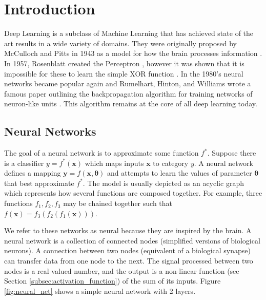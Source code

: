 
\chapter{Introduction}\label{cha:introduction}

Deep Learning is a subclass of Machine Learning that has achieved state of the art results in a wide variety of domains.
They were originally proposed by McCulloch and Pitts in 1943 as a model for how the brain processes information \cite{McCulloch_Pitts_1943}.
In 1957, Rosenblatt created the Perceptron \cite{Rosenblatt_1957, Rosenblatt_1958}, however it was shown that it is impossible for these to learn the simple XOR function \cite{Minsky_Papert_1988}.
In the 1980's neural networks became popular again and Rumelhart, Hinton, and Williams wrote a famous paper outlining the backpropagation algorithm for training networks of neuron-like units \cite{Rumelhart_Hinton_Williams_1986}.
This algorithm remains at the core of all deep learning today.


\section{Neural Networks}\label{sec:neural_network_int}
The goal of a neural network is to approximate some function $f^*$.
Suppose there is a classifier $y=f^*(\bm{x})$ which maps inputs $\bm{x}$ to category $y$.
A neural network defines a mapping $\bm{y}=f(\bm{x}, \bm{\theta})$ and attempts to learn the values of parameter $\bm{\theta}$ that best approximate $f^*$.
The model is usually depicted as an acyclic graph which represents how several functions are composed together.
For example, three functions $f_1, f_2, f_3$ may be chained together such that $f(\bm{x}) = f_3(f_2(f_1(\bm{x})))$.

We refer to these networks as neural because they are inspired by the brain.
A neural network is a collection of connected nodes (simplified versions of  biological neurons).
A connection between two nodes (equivalent of a biological synapse) can transfer data from one node to the next.
The signal processed between two nodes is a real valued number, and the output is a non-linear function (see Section \ref{subsec:activation_function}) of the sum of its inputs.
Figure \ref{fig:neural_net} shows a simple neural network with 2 layers.

\begin{figure}[hbtp!]
    \centering
\end{figure}

